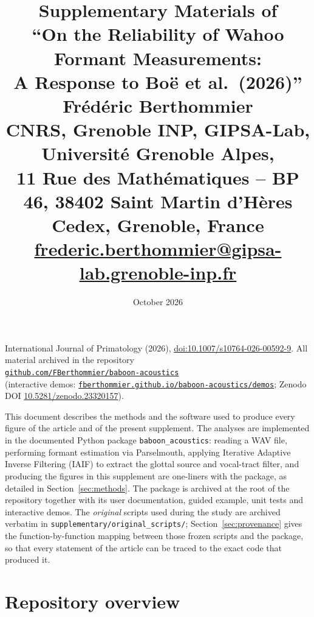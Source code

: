 \documentclass[11pt,a4paper]{article}
\title{\vspace{-1.4cm}\textbf{Supplementary Materials of\\
``On the Reliability of Wahoo Formant Measurements:\\
A Response to Bo\"e et al.\ (2026)''}\\[6mm]
\normalsize Fr\'ed\'eric Berthommier\\[2mm]
\normalsize CNRS, Grenoble INP, GIPSA-Lab, Universit\'e Grenoble Alpes,\\
11 Rue des Math\'ematiques -- BP 46, 38402 Saint Martin d'H\`eres Cedex, Grenoble, France\\[1mm]
\normalsize \href{mailto:frederic.berthommier@gipsa-lab.grenoble-inp.fr}{frederic.berthommier@gipsa-lab.grenoble-inp.fr}}
\date{October 2026}
\newcommand{\file}[1]{\texttt{#1}}
\newcommand{\pkg}{\texttt{baboon\_acoustics}}
\begin{document}
\sloppy
\maketitle
\vspace{-6mm}

\begin{center}\small
International Journal of Primatology (2026),
\href{https://doi.org/10.1007/s10764-026-00592-9}{doi:10.1007/s10764-026-00592-9}.
All material archived in the repository\\
\href{https://github.com/FBerthommier/baboon-acoustics}{\texttt{github.com/FBerthommier/baboon-acoustics}}\\
(interactive demos: \href{https://fberthommier.github.io/baboon-acoustics/demos/}{\texttt{fberthommier.github.io/baboon-acoustics/demos}};
Zenodo DOI \href{https://doi.org/10.5281/zenodo.23320157}{10.5281/zenodo.23320157}).
\end{center}

\bigskip
\noindent This document describes the methods and the software used to
produce every figure of the article and of the present supplement. The
analyses are implemented in the documented Python package \pkg{}:
reading a WAV file, performing formant estimation via Parselmouth,
applying Iterative Adaptive Inverse Filtering (IAIF) to extract the
glottal source and vocal-tract filter, and producing the figures in this
supplement are one-liners with the package, as detailed in
Section~\ref{sec:methods}. The package is archived at the root of the
repository together with its user documentation, guided example, unit
tests and interactive demos. The \emph{original} scripts used during the
study are archived verbatim in
\file{supplementary/original\_scripts/}; Section~\ref{sec:provenance}
gives the function-by-function mapping between those frozen scripts and
the package, so that every statement of the article can be traced to the
exact code that produced it.

\tableofcontents

\section{Repository overview}
\end{document}
